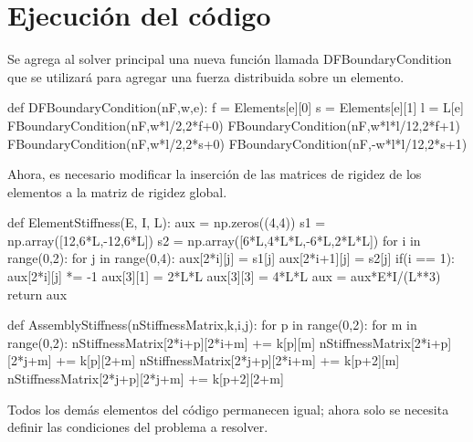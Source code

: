 \documentclass[11pt,a4paper]{article}
\begin{document}
\section{Ejecución del código}
Se agrega al solver principal una nueva función llamada DFBoundaryCondition que se utilizará para agregar una fuerza distribuida sobre un elemento.
\begin{pyglist}[language=python,caption={Carga distribuida sobre un elemento},style=pastie]
def DFBoundaryCondition(nF,w,e):
    f = Elements[e][0]
    s = Elements[e][1]
    l = L[e]
    FBoundaryCondition(nF,w*l/2,2*f+0)
    FBoundaryCondition(nF,w*l*l/12,2*f+1)
    FBoundaryCondition(nF,w*l/2,2*s+0)
    FBoundaryCondition(nF,-w*l*l/12,2*s+1)
\end{pyglist}
Ahora, es necesario modificar la inserción de las matrices de rigidez de los elementos a la matriz de rigidez global.
\begin{pyglist}[language=python,caption={Ensamble de la matriz de rigidez},style=pastie]
def ElementStiffness(E, I, L):
    aux = np.zeros((4,4))
    s1 = np.array([12,6*L,-12,6*L])
    s2 = np.array([6*L,4*L*L,-6*L,2*L*L])
    for i in range(0,2):
        for j in range(0,4):
            aux[2*i][j] = s1[j]
            aux[2*i+1][j] = s2[j]
            if(i == 1):
                aux[2*i][j] *= -1
    aux[3][1] = 2*L*L
    aux[3][3] = 4*L*L
    aux = aux*E*I/(L**3)
    return aux

def AssemblyStiffness(nStiffnessMatrix,k,i,j):
    for p in range(0,2):
        for m in range(0,2):
            nStiffnessMatrix[2*i+p][2*i+m] += k[p][m]
            nStiffnessMatrix[2*i+p][2*j+m] += k[p][2+m]
            nStiffnessMatrix[2*j+p][2*i+m] += k[p+2][m]
            nStiffnessMatrix[2*j+p][2*j+m] += k[p+2][2+m]
\end{pyglist}
Todos los demás elementos del código permanecen igual; ahora solo se necesita definir las condiciones del problema a resolver.
\end{document}
